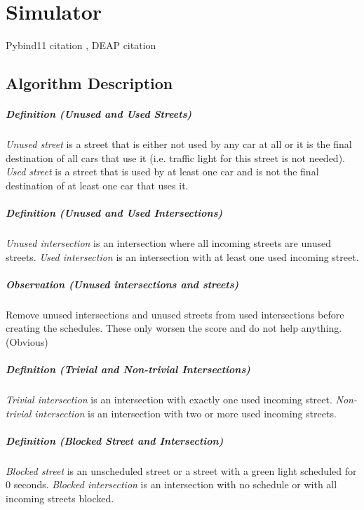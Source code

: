 \chapter{Simulator}

Pybind11 citation \cite{jakob2017pybind11}, DEAP citation \cite{fortin2012deap}

\section{Algorithm Description}

\paragraph{Definition (Unused and Used Streets)} \textit{Unused street} is a street that is either not used by any car at all or it is the final destination of all cars that use it (i.e. traffic light for this street is not needed). \textit{Used street} is a street that is used by at least one car and is not the final destination of at least one car that uses it.

\paragraph{Definition (Unused and Used Intersections)} \textit{Unused intersection} is an intersection where all incoming streets are unused streets. \textit{Used intersection} is an intersection with at least one used incoming street.

\paragraph{Observation (Unused intersections and streets)} Remove unused intersections and unused streets from used intersections before creating the schedules. These only worsen the score and do not help anything. (Obvious)

\paragraph{Definition (Trivial and Non-trivial Intersections)} \textit{Trivial intersection} is an intersection with exactly one used incoming street. \textit{Non-trivial intersection} is an intersection with two or more used incoming streets.

\paragraph{Definition (Blocked Street and Intersection)} \textit{Blocked street} is an unscheduled street or a street with a green light scheduled for 0 seconds. \textit{Blocked intersection} is an intersection with no schedule or with all incoming streets blocked.

